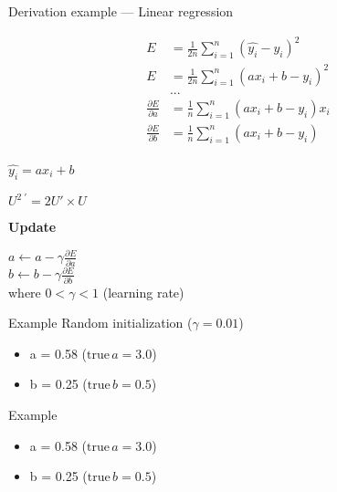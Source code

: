 \begin{frame}{Derivation example --- Linear regression}
  \begin{minipage}[l]{0.49\linewidth}
    \begin{align*}
      E & = \frac{1}{2n} \sum_{i=1}^n( \hat{y_i} - y_i )^2 \\
      E & = \frac{1}{2n}\sum_{i=1}^n( ax_i + b - y_i )^2 \\
      & ... \\
      \frac{\partial E}{\partial a} & = \frac{1}{n}\sum^n_{i=1}(ax_i + b - y_i)x_i \\
      \frac{\partial E}{\partial b} & = \frac{1}{n}\sum^n_{i=1}(ax_i + b - y_i) \\
    \end{align*}
  \end{minipage}\hfill
  \begin{minipage}[c]{0.49\linewidth}
    \begin{center}
      $\boxed{\hat{y_i} = ax_i+b}$
    \end{center}

    \begin{center}
      $\boxed{U^{2\;\prime}=2U' \times U}$
    \end{center}
    \vfill
    \begin{center}
      \textbf{Update}

      $a \leftarrow a - \gamma\frac{\partial{E}}{\partial{a}}$ \\
      $b \leftarrow b - \gamma\frac{\partial{E}}{\partial{b}}$ \\
      $\;$ \\
      where $0 < \gamma < 1$ (learning rate)
    \end{center}
  \end{minipage}\hfill
\end{frame}

\begin{frame}{Example}
  Random initialization ($\gamma = 0.01$)
  \begin{itemize}
    \item a = 0.58 ($\text{true}\, a = 3.0$)
    \item b = 0.25 ($\text{true}\, b = 0.5$)
  \end{itemize}
\end{frame}

\begin{frame}{Example}
  \begin{itemize}
    \item a = 0.58 ($\text{true}\, a = 3.0$)
    \item b = 0.25 ($\text{true}\, b = 0.5$)
  \end{itemize}
\end{frame}

